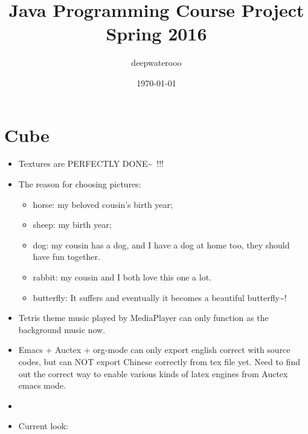 \documentclass[9pt,b5paper]{article}
\author{deepwaterooo}
\date{\today}
\title{Java Programming Course Project Spring 2016}
\begin{document}
\maketitle
\tableofcontents


\section{Cube}
\label{sec-1}
\begin{itemize}
\item Textures are PERFECTLY DONE\textasciitilde{}~!!!
\item The reason for choosing pictures: 
\begin{itemize}
\item horse: my beloved cousin's birth year;
\item sheep: my birth year;
\item dog: my cousin has a dog, and I have a dog at home too, they should have fun together.
\item rabbit: my cousin and I both love this one a lot.
\item butterfly: It suffers and eventually it becomes a beautiful butterfly\textasciitilde{}!
\end{itemize}
\item Tetris theme music played by MediaPlayer can only function as the background music now.
\item Emacs + Auctex + org-mode can only export english correct with source codes, but can NOT export Chinese correctly from tex file yet. Need to find out the correct way to enable various kinds of latex engines from Auctex emacs mode.
\item 
\item Current look:
\end{itemize}
\end{document}

